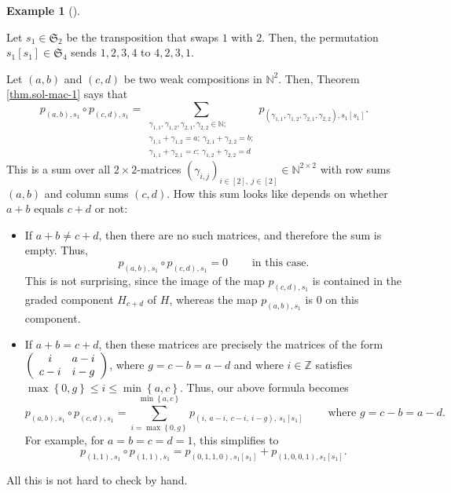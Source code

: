 \documentclass[numbers=enddot,12pt,final,onecolumn,notitlepage]{scrartcl}%
\theoremstyle{definition}
\newtheorem{exam}[theo]{Example}
\newenvironment{example}[1][]
{\begin{exam}[#1]\begin{leftbar}}
{\end{leftbar}\end{exam}}
\let\sumnonlimits\sum
\renewcommand{\sum}{\sumnonlimits\limits}
\begin{document}
\begin{example}
Let $s_{1}\in\mathfrak{S}_{2}$ be the transposition that swaps $1$ with $2$.
Then, the permutation $s_{1}\left[  s_{1}\right]  \in\mathfrak{S}_{4}$ sends
$1,2,3,4$ to $4,2,3,1$.

Let $\left(  a,b\right)  $ and $\left(  c,d\right)  $ be two weak compositions
in $\mathbb{N}^{2}$. Then, Theorem \ref{thm.sol-mac-1} says that
\[
p_{\left(  a,b\right)  ,s_{1}}\circ p_{\left(  c,d\right)  ,s_{1}}%
=\sum_{\substack{\gamma_{1,1},\gamma_{1,2},\gamma_{2,1},\gamma_{2,2}%
\in\mathbb{N};\\\gamma_{1,1}+\gamma_{1,2}=a;\ \gamma_{2,1}+\gamma
_{2,2}=b;\\\gamma_{1,1}+\gamma_{2,1}=c;\ \gamma_{1,2}+\gamma_{2,2}%
=d}}p_{\left(  \gamma_{1,1},\gamma_{1,2},\gamma_{2,1},\gamma_{2,2}\right)
,s_{1}\left[  s_{1}\right]  }.
\]
This is a sum over all $2\times2$-matrices $\left(  \gamma_{i,j}\right)
_{i\in\left[  2\right]  ,\ j\in\left[  2\right]  }\in\mathbb{N}^{2\times2}$
with row sums $\left(  a,b\right)  $ and column sums $\left(  c,d\right)  $.
How this sum looks like depends on whether $a+b$ equals $c+d$ or not:

\begin{itemize}
\item If $a+b\neq c+d$, then there are no such matrices, and therefore the sum
is empty. Thus,%
\[
p_{\left(  a,b\right)  ,s_{1}}\circ p_{\left(  c,d\right)  ,s_{1}%
}=0\ \ \ \ \ \ \ \ \ \ \text{in this case.}%
\]
This is not surprising, since the image of the map $p_{\left(  c,d\right)
,s_{1}}$ is contained in the graded component $H_{c+d}$ of $H$, whereas the
map $p_{\left(  a,b\right)  ,s_{1}}$ is $0$ on this component.

\item If $a+b=c+d$, then these matrices are precisely the matrices of the form
$\left(
\begin{array}
[c]{cc}%
i & a-i\\
c-i & i-g
\end{array}
\right)  $, where $g=c-b=a-d$ and where $i\in\mathbb{Z}$ satisfies
$\max\left\{  0,g\right\}  \leq i\leq\min\left\{  a,c\right\}  $. Thus, our
above formula becomes%
\[
p_{\left(  a,b\right)  ,s_{1}}\circ p_{\left(  c,d\right)  ,s_{1}}%
=\sum_{i=\max\left\{  0,g\right\}  }^{\min\left\{  a,c\right\}  }p_{\left(
i,\ a-i,\ c-i,\ i-g\right)  ,\ s_{1}\left[  s_{1}\right]  }%
\ \ \ \ \ \ \ \ \ \ \text{where }g=c-b=a-d.
\]
For example, for $a=b=c=d=1$, this simplifies to%
\[
p_{\left(  1,1\right)  ,s_{1}}\circ p_{\left(  1,1\right)  ,s_{1}}=p_{\left(
0,1,1,0\right)  ,s_{1}\left[  s_{1}\right]  }+p_{\left(  1,0,0,1\right)
,s_{1}\left[  s_{1}\right]  }.
\]

\end{itemize}

All this is not hard to check by hand.
\end{example}
\end{document}
